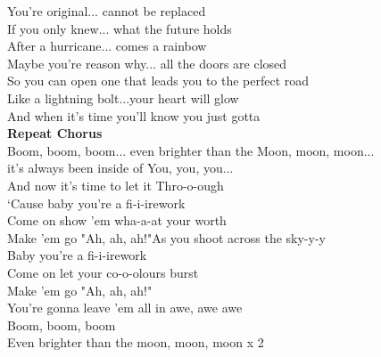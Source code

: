 You're original...  cannot be replaced\\
 If you only knew...  what the future holds\\
 After a hurricane...  comes a rainbow\\
 Maybe you're reason why...  all the doors are closed\\
 So you can open one that leads you to the perfect road\\
 Like a lightning bolt...your heart will glow\\
 And when it's time you'll know you just gotta\\
\textbf{Repeat Chorus}\\
Boom, boom, boom... even brighter than the Moon, moon, moon...\\
it's always been inside of You, you, you...\\
And now it's time to let it Thro-o-ough\\
‘Cause baby you're a fi-i-irework\\
Come on show 'em wha-a-at your worth\\
Make 'em go "Ah, ah, ah!"As you shoot across the sky-y-y\\
Baby you're a fi-i-irework\\
Come on let your co-o-olours burst\\
Make 'em go "Ah, ah, ah!"\\
You're gonna leave 'em all in awe, awe awe\\
Boom, boom, boom\\
Even brighter than the moon, moon, moon x 2\\

